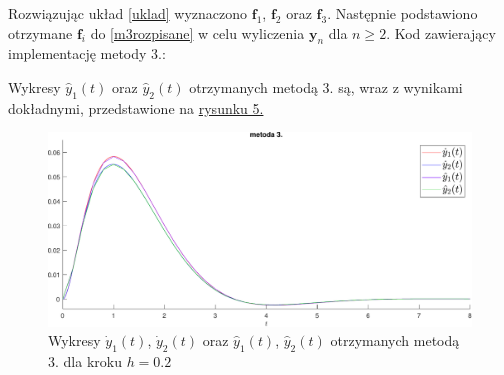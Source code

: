 \documentclass[a4paper, 12pt, twoside, openany]{article}
\newcommand{\y}{\mathbf{y}}
\newcommand{\f}{\mathbf{f}}
\begin{document}
    Rozwiązując układ \eqref{uklad} wyznaczono $\f_1$, $\f_2$ oraz $\f_3$.
    Następnie podstawiono otrzymane $\f_i$ do \eqref{m3rozpisane} w celu wyliczenia $\y_n$ dla $n \geqslant 2$.
    \newpage
    \noindent Kod zawierający implementację metody 3.:
    
    \noindent
    Wykresy $\hat{y}_1(t)$ oraz $\hat{y}_2(t)$ otrzymanych metodą 3. są, wraz z wynikami dokładnymi, przedstawione na \hyperref[fig:rys5]{rysunku 5.}
    \begin{figure}[H]
        \centering
        \includegraphics[width=\linewidth]{wykres4t.pdf}
        \caption{Wykresy $\dot{y}_1(t)$, $\dot{y}_2(t)$ oraz $\hat{y}_1(t)$, $\hat{y}_2(t)$ otrzymanych metodą 3. dla kroku $h = 0.2$ }
        \label{fig:rys5} %
    \end{figure}

    \newpage
\end{document}
